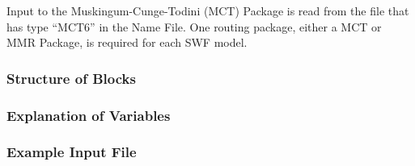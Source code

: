 Input to the Muskingum-Cunge-Todini (MCT) Package is read from the file that has type ``MCT6'' in the Name File.  One routing package, either a MCT or MMR Package, is required for each SWF model. 

\vspace{5mm}
\subsubsection{Structure of Blocks}



\vspace{5mm}
\subsubsection{Explanation of Variables}
\begin{description}

\end{description}

\vspace{5mm}
\subsubsection{Example Input File}


